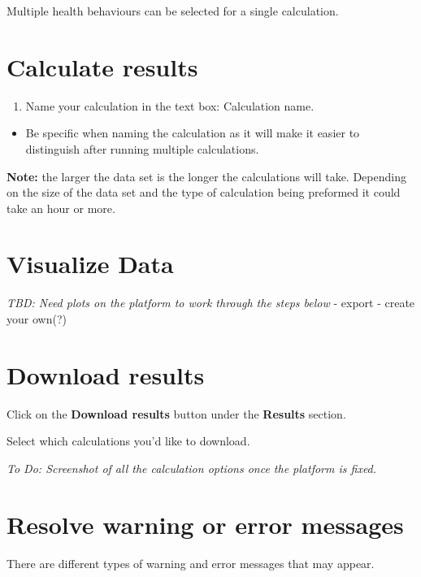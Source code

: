 \documentclass[]{book}
\providecommand{\tightlist}{%
  \setlength{\itemsep}{0pt}\setlength{\parskip}{0pt}}
\begin{document}
Multiple health behaviours can be selected for a single calculation.

\section{Calculate results}\label{calculate-results}

\begin{enumerate}
\def\labelenumi{\arabic{enumi}.}
\tightlist
\item
  Name your calculation in the text box: Calculation name.
\end{enumerate}

\begin{itemize}
\tightlist
\item
  Be specific when naming the calculation as it will make it easier to
  distinguish after running multiple calculations.
\end{itemize}

\textbf{Note:} the larger the data set is the longer the calculations
will take. Depending on the size of the data set and the type of
calculation being preformed it could take an hour or more.

\section{Visualize Data}\label{visualize-data}

\emph{TBD: Need plots on the platform to work through the steps below} -
export - create your own(?)

\section{Download results}\label{download-results}

Click on the \textbf{Download results} button under the \textbf{Results}
section.

Select which calculations you'd like to download.

\emph{To Do: Screenshot of all the calculation options once the platform
is fixed.}

\section{Resolve warning or error
messages}\label{resolve-warning-or-error-messages}

There are different types of warning and error messages that may appear.
\end{document}
